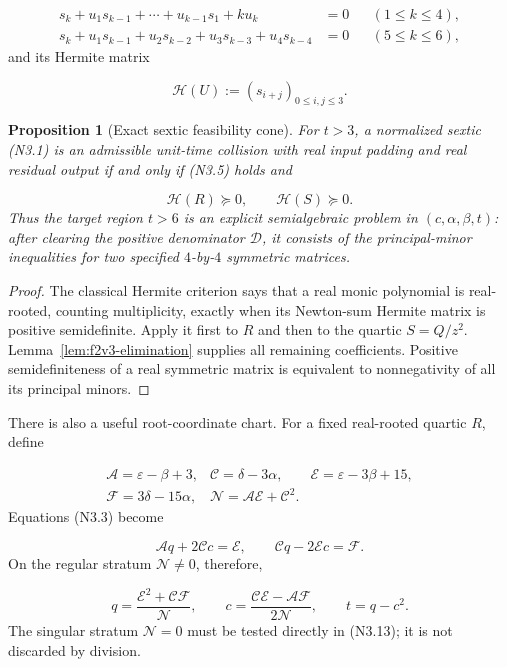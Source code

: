 \documentclass[11pt]{article}
\newtheorem{proposition}[theorem]{Proposition}
\theoremstyle{definition}
\theoremstyle{remark}
\begin{document}
\[
\begin{aligned}
s_k+u_1s_{k-1}+\cdots+u_{k-1}s_1+ku_k&=0
 &&(1\le k\le4),\\
s_k+u_1s_{k-1}+u_2s_{k-2}+u_3s_{k-3}+u_4s_{k-4}&=0
 &&(5\le k\le6),
\end{aligned}
\tag{N3.9}
\]
and its Hermite matrix

\[
 \mathcal H(U):=(s_{i+j})_{0\le i,j\le3}.
 \tag{N3.10}
\]

\begin{proposition}[Exact sextic feasibility cone]
\label{prop:f2v3-cone}
For \(t>3\), a normalized sextic \textup{(N3.1)} is an admissible
unit-time collision with real input padding and real residual output if
and only if \textup{(N3.5)} holds and

\[
 \boxed{
 \mathcal H(R)\succeq0,
 \qquad
 \mathcal H(S)\succeq0.}
 \tag{N3.11}
\]
Thus the target region \(t>6\) is an explicit semialgebraic problem in
\((c,\alpha,\beta,t)\): after clearing the positive denominator
\(\mathcal D\), it consists of the principal-minor inequalities for two
specified \(4\)-by-\(4\) symmetric matrices.
\end{proposition}

\begin{proof}
The classical Hermite criterion says that a real monic polynomial is
real-rooted, counting multiplicity, exactly when its Newton-sum Hermite
matrix is positive semidefinite.  Apply it first to \(R\) and then to the
quartic \(S=Q/z^2\).  Lemma~\ref{lem:f2v3-elimination} supplies all
remaining coefficients.  Positive semidefiniteness of a real symmetric
matrix is equivalent to nonnegativity of all its principal minors.
\end{proof}

There is also a useful root-coordinate chart.  For a fixed real-rooted
quartic \(R\), define

\[
\begin{array}{lll}
\mathcal A=\varepsilon-\beta+3,
&\mathcal C=\delta-3\alpha,
&\mathcal E=\varepsilon-3\beta+15,\\
\mathcal F=3\delta-15\alpha,
&\mathcal N=\mathcal A\mathcal E+\mathcal C^2.
\end{array}
\tag{N3.12}
\]
Equations \textup{(N3.3)} become

\[
 \mathcal A q+2\mathcal Cc=\mathcal E,
 \qquad
 \mathcal Cq-2\mathcal Ec=\mathcal F.
 \tag{N3.13}
\]
On the regular stratum \(\mathcal N\ne0\), therefore,

\[
 \boxed{
 q=\frac{\mathcal E^2+\mathcal C\mathcal F}{\mathcal N},
 \qquad
 c=\frac{\mathcal C\mathcal E-\mathcal A\mathcal F}{2\mathcal N},
 \qquad
 t=q-c^2.}
 \tag{N3.14}
\]
The singular stratum \(\mathcal N=0\) must be tested directly in
\textup{(N3.13)}; it is not discarded by division.
\end{document}
